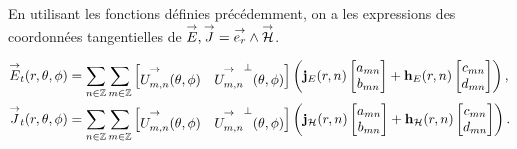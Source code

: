     En utilisant les fonctions définies précédemment, on a les expressions des coordonnées tangentielles de \({\overset{\rightarrow}{E}},{\overset{\rightarrow}{J}} = {\overset{\rightarrow}{e_r}}\wedge{\overset{\rightarrow}{\mathcal{H}}}\).
    \begin{prop}
        \label{prop:imp_fourier:sphere:Et}
        \begin{align*}
            {\overset{\rightarrow}{E}}_t(r,\theta,\phi) &= \sum_{n\in\mathbb Z}\sum_{m\in\mathbb Z}
            \begin{bmatrix}
                {\overset{\rightarrow}{U_{m,n}^{{}}}}(\theta,\phi) & {\overset{\rightarrow}{U_{m,n}^{{}}}}^\perp(\theta,\phi)
            \end{bmatrix}
            \left(
                \mathbf{j}_E(r,n)
                \begin{bmatrix}
                    a_{mn}
                    \\
                    b_{mn}
                \end{bmatrix}
                +
                \mathbf{h}_E(r,n)
                \begin{bmatrix}
                    c_{mn}
                    \\
                    d_{mn}
                \end{bmatrix}
            \right),
            \\
            {\overset{\rightarrow}{J}}_t(r,\theta,\phi) &= \sum_{n\in\mathbb Z}\sum_{m\in\mathbb Z}
            \begin{bmatrix}
                {\overset{\rightarrow}{U_{m,n}^{{}}}}(\theta,\phi) & {\overset{\rightarrow}{U_{m,n}^{{}}}}^\perp(\theta,\phi)
            \end{bmatrix}
            \left(
                \mathbf{j}_{\mathcal{H}}(r,n)
                \begin{bmatrix}
                    a_{mn}
                    \\
                    b_{mn}
                \end{bmatrix}
                +
                \mathbf{h}_{\mathcal{H}}(r,n)
                \begin{bmatrix}
                    c_{mn}
                    \\
                    d_{mn}
                \end{bmatrix}
            \right).
        \end{align*}
    \end{prop}

